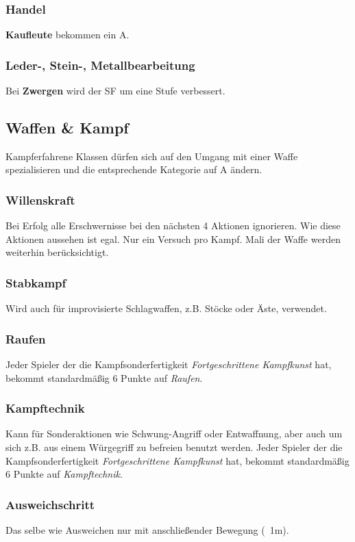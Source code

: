 \subsubsection{Handel}
\textbf{Kaufleute} bekommen ein A.

\subsubsection{Leder-, Stein-, Metallbearbeitung}
Bei \textbf{Zwergen} wird der SF um eine Stufe verbessert. 

\subsection{Waffen \& Kampf}
\label{chap:waffen_und_kampf}
Kampferfahrene Klassen dürfen sich auf den Umgang mit einer Waffe spezialisieren und die entsprechende Kategorie auf A ändern.

\subsubsection{Willenskraft}
Bei Erfolg alle Erschwernisse bei den nächsten 4 Aktionen ignorieren. Wie diese Aktionen aussehen ist egal. Nur ein Versuch pro Kampf. Mali der Waffe werden weiterhin berücksichtigt.

\subsubsection{Stabkampf}
Wird auch für improvisierte Schlagwaffen, z.B. Stöcke oder Äste, verwendet.

\subsubsection{Raufen}
Jeder Spieler der die Kampfsonderfertigkeit \textit{Fortgeschrittene Kampfkunst} hat, bekommt standardmäßig 6 Punkte auf \textit{Raufen}.

\subsubsection{Kampftechnik}
Kann für Sonderaktionen wie Schwung-Angriff oder Entwaffnung, aber auch um sich z.B. aus einem Würgegriff zu befreien benutzt werden. Jeder Spieler der die Kampfsonderfertigkeit \textit{Fortgeschrittene Kampfkunst} hat, bekommt standardmäßig 6 Punkte auf \textit{Kampftechnik}.

\subsubsection{Ausweichschritt}
Das selbe wie Ausweichen nur mit anschließender Bewegung (~1m).


